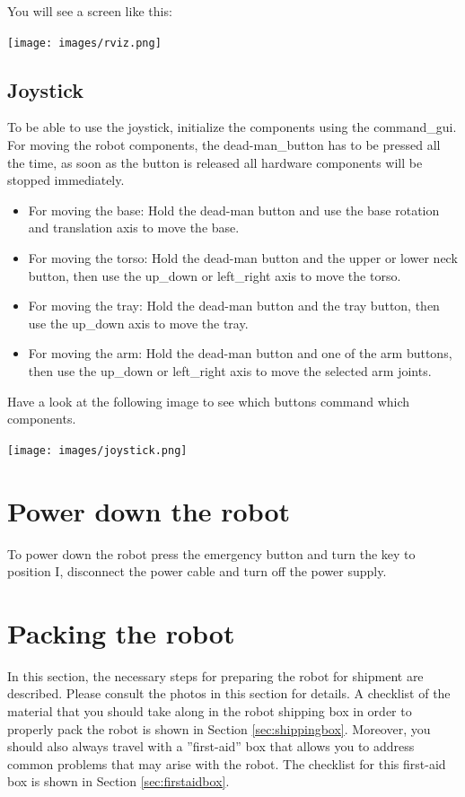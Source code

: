 You will see a screen like this:
\begin {center}
\texttt{[image: images/rviz.png]}
\end{center}

\subsection{Joystick}
To be able to use the joystick, initialize the components using the command\_gui. For moving the robot components, the dead-man\_button has to be pressed all the time, as soon as the button is released all hardware components will be stopped immediately. 

\begin{itemize}
\item For moving the base: Hold the dead-man button and use the base rotation and translation axis to move the base.
\item For moving the torso: Hold the dead-man button and the upper or lower neck button, then use the up\_down or left\_right axis to move the torso.
\item For moving the tray: Hold the dead-man button and the tray button, then use the up\_down axis to move the tray.
\item For moving the arm: Hold the dead-man button and one of the arm buttons, then use the up\_down or left\_right axis to move the selected arm joints.
\end{itemize}

Have a look at the following image to see which buttons command which components. 
\begin{center}
\texttt{[image: images/joystick.png]}
\end{center}

\section{Power down the robot}
To power down the robot press the emergency button and turn the key to position I, disconnect the power cable and turn off the power supply.

\section{Packing the robot}
In this section, the necessary steps for preparing the robot for shipment are described. Please consult the photos in this section for details.
A checklist of the material that you should take along in the robot shipping box in order to properly pack the robot is shown in Section \ref{sec:shippingbox}.
Moreover, you should also always travel with a ''first-aid'' box that allows you to address common problems that may arise with the robot. The checklist for this first-aid box is shown in Section \ref{sec:firstaidbox}.


